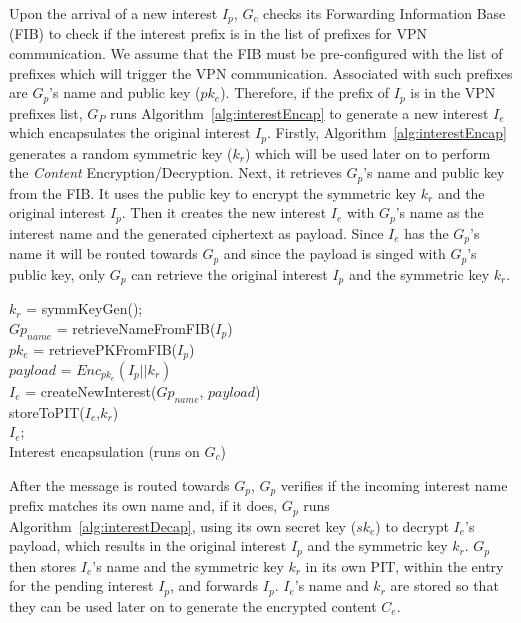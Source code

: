 \documentclass[conference,letterpaper,10pt]{IEEEtran}
\begin{document}
Upon the arrival of a new interest $I_p$, $G_c$ checks its Forwarding Information Base (FIB) to check if the interest prefix is in the list of prefixes for VPN communication. We assume that the FIB must be pre-configured with the list of prefixes which will trigger the VPN communication. Associated with such prefixes are $G_p$'s name and public key ($pk_e$). Therefore, if the prefix of $I_p$ is in the VPN prefixes list, $G_P$ runs Algorithm~\ref{alg:interestEncap} to generate a new interest $I_e$ which encapsulates the original interest $I_p$. Firstly, Algorithm~\ref{alg:interestEncap} generates a random symmetric key ($k_r$) which will be used later on to perform the \textit{Content} Encryption/Decryption. Next, it retrieves $G_p$'s name and public key from the FIB. It uses the public key to encrypt the symmetric key $k_r$ and the original interest $I_p$. Then it creates the new interest $I_e$ with $G_p$'s name as the interest name and the generated ciphertext as payload. Since $I_e$ has  the $G_p$'s name it will be routed towards $G_p$ and since the payload is singed with $G_p$'s public key, only $G_p$ can retrieve the original interest $I_p$ and the symmetric key $k_r$.

\begin{algorithm}[]\label{alg:interestEncap}
$k_r$ = symmKeyGen();\\
$Gp_{name}$ = retrieveNameFromFIB($I_p$)\\
$pk_e$ = retrievePKFromFIB($I_p$)\\
$payload$ = $Enc_{pk_e}(I_p||k_r)$\\
$I_e$ = createNewInterest($Gp_{name}$, $payload$)\\
storeToPIT($I_e$,$k_r$)\\
\Return $I_e$;\\
\caption{Interest encapsulation (runs on $G_c$)}
\end{algorithm}

After the message is routed towards $G_p$, $G_p$ verifies if the incoming interest name prefix matches its own name and, if it does, $G_p$ runs Algorithm~\ref{alg:interestDecap}, using its own secret key ($sk_e$) to decrypt $I_e$'s payload, which results in the original interest $I_p$ and the symmetric key $k_r$. $G_p$ then stores $I_e$'s name and the symmetric key $k_r$ in its own PIT, within the entry for the pending interest $I_p$, and forwards $I_p$. $I_e$'s name and $k_r$ are stored so that they can be used later on to generate the encrypted content $C_e$.
\end{document}
